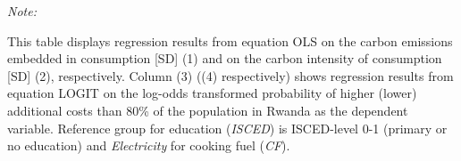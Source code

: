 \begin{table}[htbp!]
\begin{adjustbox}{width = 1\textwidth, max height = 0.95\textheight, center}
\begin{threeparttable}[b]
         \begin{tablenotes}\item \medskip \textit{Note:}
            \item This table displays regression results from equation OLS on the carbon emissions embedded in consumption [SD] (1) and on the carbon intensity of consumption [SD] (2), respectively. 
                                      Column (3) ((4) respectively) shows regression results from equation LOGIT on the log-odds transformed probability of higher (lower) additional costs than 80\% of the population in Rwanda as the dependent variable. Reference group for education (\textit{ISCED}) is ISCED-level 0-1 (primary or no education) and \textit{Electricity} for cooking fuel (\textit{CF}).
         \end{tablenotes}
      \end{threeparttable}
   \end{adjustbox}
\end{table}


